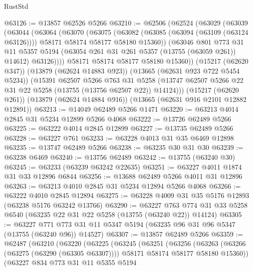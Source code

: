 \begin{lexlean}{RustStd}
\begin{coremodule}
@63126 := @13857 @62526 @5266
@63210 := @62506
    (@62524
      (@63029
        (@63039
          (@63044
            (@63064
              (@63070
                (@63075
                  (@63082
                    (@63085 (@63094 (@63109 (@63124 @63126))))
                    @58171
                    @58174
                    @58177
                    @58180
                    @15360))
                (@63046
                  @801
                  @773
                  @31
                  @11
                  @5357
                  @5194
                  (@63054 @261 @31 @261 @5357 (@13755 (@63059 @261)) @14612)
                  @63126))))
          @58171
          @58174
          @58177
          @58180
          @15360))
      (@15217 (@62620 @347))
      (@13879 (@62624 @14883 @923))
      (@13665 (@62631 @923 @722 @5454 @5234))
      (@15391
        @62507
        @5266
        @763
        @31
        @5258
        (@13747 @62507 @5266 @22 @31 @22 @5258 (@13755 (@13756 @62507 @22)) @14124)))
    (@15217 (@62620 @261))
    (@13879 (@62624 @14884 @916))
    (@13665 (@62631 @916 @2101 @12882 @12891))
@63213 := @14049 @62489 @5266 @1471
@63220 := @63213 @4014 @2845 @31 @5234 @12899 @5266 @4068
@63222 := @13726 @62489 @5266
@63225 := @63222 @4014 @2845 @12899
@63227 := @13735 @62489 @5266
@63228 := @63227 @761
@63233 := @63228 @4013 @31 @35 @6469 @12898
@63235 := @13747 @62489 @5266
@63238 := @63235 @30 @31 @30
@63239 := @63238 @6469
@63240 := @13756 @62489
@63242 := @13755 (@63240 @30)
@63245 := @63233 (@63239 @63242 @22635)
@63251 := @63227 @4011 @1874 @31 @33 @12896 @6844
@63256 := @13688 @62489 @5266 @4011 @31 @12896
@63263 := @63213 @4010 @2845 @31 @5234 @12894 @5266 @4068
@63266 := @63222 @4010 @2845 @12894
@63275 := @63228 @4009 @31 @35 @5176 @12893 (@63238 @5176 @63242 @13766)
@63290 := @63227
    @763
    @774
    @31
    @33
    @5258
    @6540
    (@63235 @22 @31 @22 @5258 (@13755 (@63240 @22)) @14124)
@63305 := @63227
    @771
    @773
    @31
    @11
    @5347
    @5194
    (@63235 @96 @31 @96 @5347 (@13755 (@63240 @96)) @14527)
@63307 := @13857 @62489 @5266
@63359 := @62487
    (@63210
      (@63220
        (@63225
          (@63245
            (@63251
              (@63256
                (@63263
                  (@63266 (@63275 (@63290 (@63305 @63307))))
                  @58171
                  @58174
                  @58177
                  @58180
                  @15360))
              (@63227
                @834
                @773
                @31
                @11
                @5355
                @5194

\end{coremodule}
\end{lexlean}

